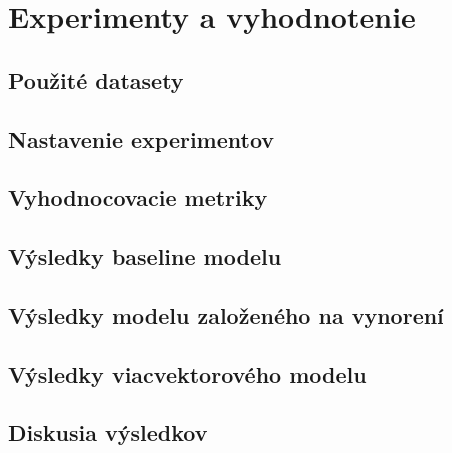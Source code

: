 \chapter{Experimenty a vyhodnotenie}

\label{kap:experimenty}

\section{Použité datasety}

\section{Nastavenie experimentov}

\section{Vyhodnocovacie metriky}

\section{Výsledky baseline modelu}

\section{Výsledky modelu založeného na vynorení}

\section{Výsledky viacvektorového modelu}

\section{Diskusia výsledkov}
